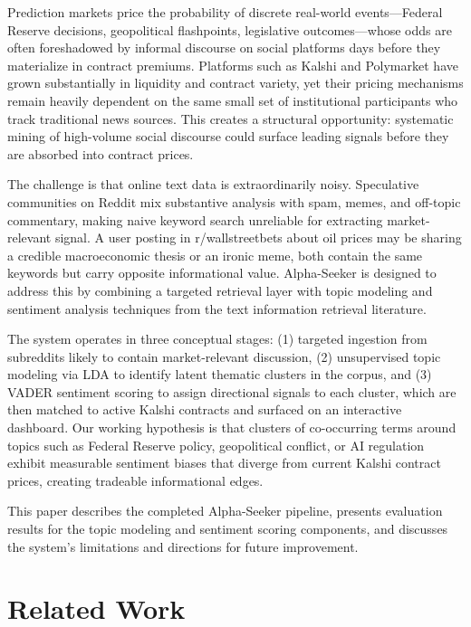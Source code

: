 \documentclass[sigconf]{acmart}
\begin{document}
Prediction markets price the probability of discrete real-world events---Federal Reserve decisions, geopolitical flashpoints, legislative outcomes---whose odds are often foreshadowed by informal discourse on social platforms days before they materialize in contract premiums. Platforms such as Kalshi and Polymarket have grown substantially in liquidity and contract variety, yet their pricing mechanisms remain heavily dependent on the same small set of institutional participants who track traditional news sources. This creates a structural opportunity: systematic mining of high-volume social discourse could surface leading signals before they are absorbed into contract prices.

The challenge is that online text data is extraordinarily noisy. Speculative communities on Reddit mix substantive analysis with spam, memes, and off-topic commentary, making naive keyword search unreliable for extracting market-relevant signal. A user posting in r/wallstreetbets about oil prices may be sharing a credible macroeconomic thesis or an ironic meme, both contain the same keywords but carry opposite informational value. Alpha-Seeker is designed to address this by combining a targeted retrieval layer with topic modeling and sentiment analysis techniques from the text information retrieval literature.

The system operates in three conceptual stages: (1) targeted ingestion from subreddits likely to contain market-relevant discussion, (2) unsupervised topic modeling via LDA to identify latent thematic clusters in the corpus, and (3) VADER sentiment scoring to assign directional signals to each cluster, which are then matched to active Kalshi contracts and surfaced on an interactive dashboard. Our working hypothesis is that clusters of co-occurring terms around topics such as Federal Reserve policy, geopolitical conflict, or AI regulation exhibit measurable sentiment biases that diverge from current Kalshi contract prices, creating tradeable informational edges.

This paper describes the completed Alpha-Seeker pipeline, presents evaluation results for the topic modeling and sentiment scoring components, and discusses the system's limitations and directions for future improvement.

\section{Related Work}
\end{document}
